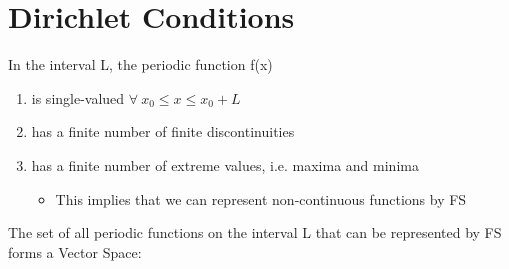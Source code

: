 \documentclass[a4paper, 11pt, normalem]{report}
\begin{document}
\section{Dirichlet Conditions}
In the interval L, the periodic function f(x)
\begin{enumerate}
    \item is single-valued $\forall~ x_0 \leq x \leq x_0 + L$
    \item has a finite number of finite discontinuities
    \item has a finite number of extreme values, i.e. maxima and minima
        \begin{itemize}
            \item This implies that we can represent non-continuous functions by FS
        \end{itemize}
\end{enumerate}
The set of all periodic functions on the interval L that can be represented by FS forms a Vector Space:
\end{document}
